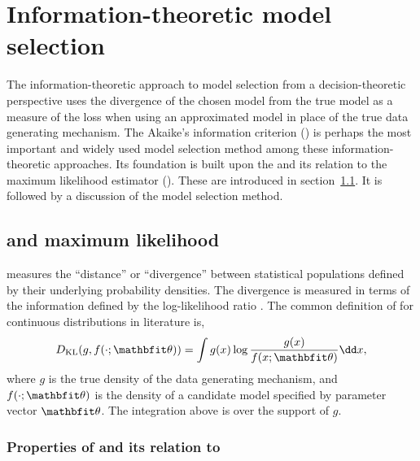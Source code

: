 \chapter{Information-theoretic model selection}
\label{cha:Information-theoretic model selection}

The information-theoretic approach to model selection from a
decision-theoretic perspective uses the divergence of the chosen model from
the true model as a measure of the loss when using an approximated model in
place of the true data generating mechanism. The Akaike's information
criterion (\aic) is perhaps the most important and widely used model selection
method among these information-theoretic approaches. Its foundation is built
upon the \kl and its relation to the maximum likelihood estimator (\mle).
These are introduced in section~\ref{sec:kl and maximum likelihood}. It is
followed by a discussion of the \aic model selection method.

\section{\kl and maximum likelihood}
\label{sec:kl and maximum likelihood}

\kl measures the ``distance'' or ``divergence'' between statistical
populations defined by their underlying probability densities. The divergence
is measured in terms of the information defined by the log-likelihood ratio
\parencite{Kullback:1951va}. The common definition of \kl for continuous
distributions in literature is,
\begin{equation}
  \dkl(g, f(\cdot;\bth)) = \int g(x)\log\frac{g(x)}{f(x;\bth)}\dd x,
  \label{eq:kld}
\end{equation}
where $g$ is the true density of the data generating mechanism, and
$f(\cdot;\bth)$ is the density of a candidate model specified by parameter
vector $\bth$. The integration above is over the support of $g$.

\subsection{Properties of \kl and its relation to \protect\mle}
\label{sub:Properties of kl and its relation to mle}

